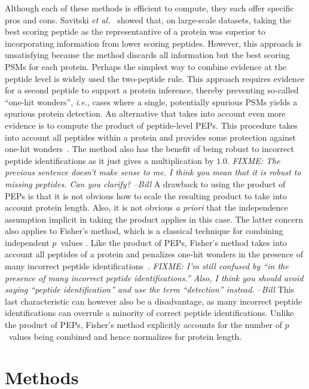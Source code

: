 \documentclass{article}
\begin{document}
Although each of these methods is efficient to compute, they each
offer specific pros and cons.  Savitski {\em et
  al.}~\cite{savitski2015scalable} showed that, on large-scale
datasets, taking the best scoring peptide as the representantive of a
protein was superior to incorporating information from lower scoring
peptides. However, this approach is unsatisfying because the method
discards all information but the best scoring PSMs for each protein.
Perhaps the simplest way to combine evidence at the peptide level is
widely used the two-peptide rule.  This approach requires evidence for
a second peptide to support a protein inference, thereby preventing
so-called ``one-hit wonders'', {\em i.e.}, cases where a single,
potentially spurious PSMs yields a spurious protein detection.  An
alternative that takes into account even more evidence is to compute
the product of peptide-level PEPs. This procedure takes into account
all peptides within a protein and provides some protection against
one-hit wonders~\cite{cox2008maxquant}. The method also has the
benefit of being robust to incorrect peptide identifications as it
just gives a multiplication by $1.0$. {\em FIXME: The previous
  sentence doesn't make sense to me.  I think you mean that it is
  robust to missing peptides.  Can you clarify? --Bill} A drawback to
using the product of PEPs is that it is not obvious how to scale the
resulting product to take into account protein length.  Also, it is
not obvious {\em a priori} that the independence assumption implicit
in taking the product applies in this case.  The latter concern also
applies to Fisher's method, which is a classical technique for
combining independent $p$~values \cite{FIXME}.  Like the product of
PEPs, Fisher's method takes into account all peptides of a protein and
penalizes one-hit wonders in the presence of many incorrect peptide
identifications~\cite{spirin2011assigning, alves2015mass,
  granholm2013determining}. {\em FIXME: I'm still confused by ``in the
  presence of many incorrect peptide identifications.''  Also, I think
  you should avoid saying ``peptide identification'' and use the term
  ``detection'' instead. --Bill} This last characteristic can however
also be a disadvantage, as many incorrect peptide identifications can
overrule a minority of correct peptide identifications.  Unlike the
product of PEPs, Fisher's method explicitly accounts for the number of
$p$~values being combined and hence normalizes for protein length.

\section*{Methods}
\end{document}
